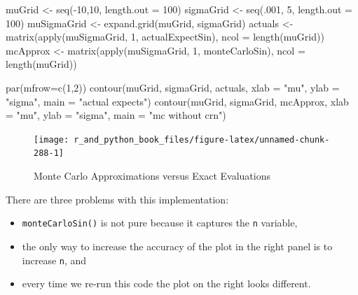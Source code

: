 \documentclass[
  12pt,
  krantz2]{krantz}
\makeatletter
\newenvironment{Shaded}{\begin{snugshade}}{\end{snugshade}}
\newcommand{\AttributeTok}[1]{\textcolor[rgb]{0.61,0.61,0.61}{#1}}
\newcommand{\DecValTok}[1]{\textcolor[rgb]{0.06,0.06,0.06}{#1}}
\newcommand{\FunctionTok}[1]{\textcolor[rgb]{0,0,0}{#1}}
\newcommand{\NormalTok}[1]{#1}
\newcommand{\OtherTok}[1]{\textcolor[rgb]{0.37,0.37,0.37}{#1}}
\newcommand{\SpecialCharTok}[1]{\textcolor[rgb]{0,0,0}{#1}}
\newcommand{\StringTok}[1]{\textcolor[rgb]{0.5,0.5,0.5}{#1}}
\providecommand{\tightlist}{%
  \setlength{\itemsep}{0pt}\setlength{\parskip}{0pt}}
\newenvironment{kframe}{%
\medskip{}
\setlength{\fboxsep}{.8em}
 \def\at@end@of@kframe{}%
 \ifinner\ifhmode%
  \def\at@end@of@kframe{\end{minipage}}%
  \begin{minipage}{\columnwidth}%
 \fi\fi%
 \def\FrameCommand##1{\hskip\@totalleftmargin \hskip-\fboxsep
 \colorbox{shadecolor}{##1}\hskip-\fboxsep
     \hskip-\linewidth \hskip-\@totalleftmargin \hskip\columnwidth}%
 \MakeFramed {\advance\hsize-\width
   \@totalleftmargin\z@ \linewidth\hsize
   \@setminipage}}%
 {\par\unskip\endMakeFramed%
 \at@end@of@kframe}
\renewenvironment{Shaded}{\begin{kframe}}{\end{kframe}}
\makeatother
\begin{document}
\begin{Shaded}
\begin{Highlighting}[]
\NormalTok{muGrid }\OtherTok{\textless{}{-}} \FunctionTok{seq}\NormalTok{(}\SpecialCharTok{{-}}\DecValTok{10}\NormalTok{,}\DecValTok{10}\NormalTok{, }\AttributeTok{length.out =} \DecValTok{100}\NormalTok{)}
\NormalTok{sigmaGrid }\OtherTok{\textless{}{-}} \FunctionTok{seq}\NormalTok{(.}\DecValTok{001}\NormalTok{, }\DecValTok{5}\NormalTok{, }\AttributeTok{length.out =} \DecValTok{100}\NormalTok{)}
\NormalTok{muSigmaGrid }\OtherTok{\textless{}{-}} \FunctionTok{expand.grid}\NormalTok{(muGrid, sigmaGrid)}
\NormalTok{actuals }\OtherTok{\textless{}{-}}  \FunctionTok{matrix}\NormalTok{(}\FunctionTok{apply}\NormalTok{(muSigmaGrid, }\DecValTok{1}\NormalTok{, actualExpectSin), }
                   \AttributeTok{ncol =} \FunctionTok{length}\NormalTok{(muGrid))}
\NormalTok{mcApprox }\OtherTok{\textless{}{-}} \FunctionTok{matrix}\NormalTok{(}\FunctionTok{apply}\NormalTok{(muSigmaGrid, }\DecValTok{1}\NormalTok{, monteCarloSin), }
                   \AttributeTok{ncol =} \FunctionTok{length}\NormalTok{(muGrid))}

\FunctionTok{par}\NormalTok{(}\AttributeTok{mfrow=}\FunctionTok{c}\NormalTok{(}\DecValTok{1}\NormalTok{,}\DecValTok{2}\NormalTok{))}
\FunctionTok{contour}\NormalTok{(muGrid, sigmaGrid, actuals, }
        \AttributeTok{xlab =} \StringTok{"mu"}\NormalTok{, }\AttributeTok{ylab =} \StringTok{"sigma"}\NormalTok{, }\AttributeTok{main =} \StringTok{"actual expects"}\NormalTok{)}
\FunctionTok{contour}\NormalTok{(muGrid, sigmaGrid, mcApprox, }
        \AttributeTok{xlab =} \StringTok{"mu"}\NormalTok{, }\AttributeTok{ylab =} \StringTok{"sigma"}\NormalTok{, }\AttributeTok{main =} \StringTok{"mc without crn"}\NormalTok{)}
\end{Highlighting}
\end{Shaded}

\begin{figure}

{\centering \texttt{[image: r\_and\_python\_book\_files/figure-latex/unnamed-chunk-288-1]} 

}

\caption{Monte Carlo Approximations versus Exact Evaluations}\label{fig:unnamed-chunk-288}
\end{figure}

There are three problems with this implementation:

\begin{itemize}
\tightlist
\item
  \texttt{monteCarloSin()} is not pure because it captures the \texttt{n} variable,
\item
  the only way to increase the accuracy of the plot in the right panel is to increase \texttt{n}, and
\item
  every time we re-run this code the plot on the right looks different.
\end{itemize}
\end{document}
